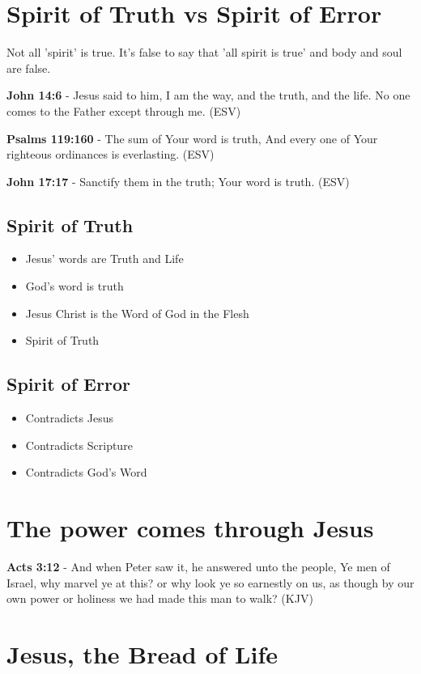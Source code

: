 \documentclass[11pt]{article}
\begin{document}
\section{Spirit of Truth vs Spirit of Error}
\label{sec:org2be96c5}
Not all 'spirit' is true.
It's false to say that 'all spirit is true' and body and soul are false.

\textbf{John 14:6} - Jesus said to him, I am the way, and the truth, and the life. No one comes to the Father except through me. (ESV)

\textbf{Psalms 119:160} - The sum of Your word is truth, And every one of Your righteous ordinances is everlasting. (ESV)

\textbf{John 17:17} - Sanctify them in the truth; Your word is truth. (ESV)

\subsection{Spirit of Truth}
\label{sec:org0552a26}
\begin{itemize}
\item Jesus' words are Truth and Life
\item God's word is truth
\item Jesus Christ is the Word of God in the Flesh
\item Spirit of Truth
\end{itemize}

\subsection{Spirit of Error}
\label{sec:org257cb9f}
\begin{itemize}
\item Contradicts Jesus
\item Contradicts Scripture
\item Contradicts God's Word
\end{itemize}

\section{The power comes through Jesus}
\label{sec:orgb4d5ab5}
\textbf{Acts 3:12} - And when Peter saw it, he answered unto the people, Ye men of Israel, why marvel ye at this? or why look ye so earnestly on us, as though by our own power or holiness we had made this man to walk? (KJV)

\section{Jesus, the Bread of Life}
\label{sec:org65aebb3}
\end{document}
